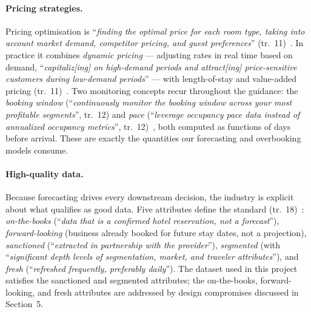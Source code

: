 \paragraph{Pricing strategies.}
Pricing optimisation is ``\emph{finding the optimal price for each room type, taking into account market demand, competitor pricing, and guest preferences}'' (tr.~11)~\cite{amadeus2023}. In practice it combines \emph{dynamic pricing} --- adjusting rates in real time based on demand, ``\emph{capitaliz[ing] on high-demand periods and attract[ing] price-sensitive customers during low-demand periods}'' --- with length-of-stay and value-added pricing (tr.~11)~\cite{amadeus2023}. Two monitoring concepts recur throughout the guidance: the \emph{booking window} (``\emph{continuously monitor the booking window across your most profitable segments}'', tr.~12) and \emph{pace} (``\emph{leverage occupancy pace data instead of annualized occupancy metrics}'', tr.~12)~\cite{amadeus2023}, both computed as functions of days before arrival. These are exactly the quantities our forecasting and overbooking models consume.

\paragraph{High-quality data.}
Because forecasting drives every downstream decision, the industry is explicit about what qualifies as good data. Five attributes define the standard (tr.~18)~\cite{amadeus2023}: \emph{on-the-books} (``\emph{data that is a confirmed hotel reservation, not a forecast}''), \emph{forward-looking} (business already booked for future stay dates, not a projection), \emph{sanctioned} (``\emph{extracted in partnership with the provider}''), \emph{segmented} (with ``\emph{significant depth levels of segmentation, market, and traveler attributes}''), and \emph{fresh} (``\emph{refreshed frequently, preferably daily}''). The dataset used in this project satisfies the sanctioned and segmented attributes; the on-the-books, forward-looking, and fresh attributes are addressed by design compromises discussed in Section~5.

